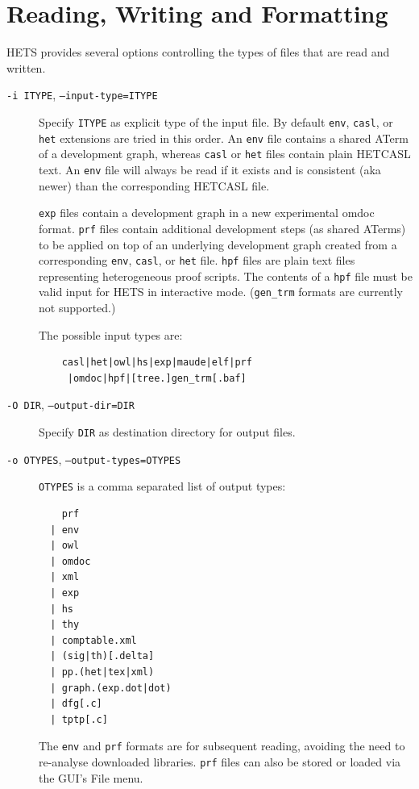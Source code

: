 \documentclass{article}
\newcommand{\normalTEXTSC}[2]{{#1\scriptsize#2}}
\newcommand     {\Hets}{\normalTEXTSC{H}{ETS}\xspace}
\newcommand{\HetCASL}{\normalTEXTSC{H}{ET}\normalTEXTSC{C}{ASL}\xspace}
\begin{document}
\section{Reading, Writing and Formatting}

\Hets provides several options controlling the types of files
that are read and written.
\begin{description}
\item[\texttt{-i ITYPE}, \texttt{--input-type=ITYPE}] Specify \texttt{ITYPE}
  as explicit type of the input file.  By default \texttt{env}, \texttt{casl},
  or \texttt{het} extensions are tried in this order.  An \texttt{env} file
  contains a shared ATerm of a development graph, whereas \texttt{casl} or
  \texttt{het} files contain plain \HetCASL text. An \texttt{env} file will
  always be read if it exists and is consistent (aka newer) than the
  corresponding \HetCASL file.

  \texttt{exp} files contain a development graph in a new experimental omdoc
  format.  \texttt{prf} files contain additional development steps (as shared
  ATerms) to be applied on top of an underlying development graph created from
  a corresponding \texttt{env}, \texttt{casl}, or \texttt{het}
  file. \texttt{hpf} files are plain text files representing heterogeneous
  proof scripts. The contents of a \texttt{hpf} file must be valid input for
  \Hets in interactive mode.  (\texttt{gen\_trm} formats are currently not
  supported.)

The possible input types are:
\begin{verbatim}
    casl|het|owl|hs|exp|maude|elf|prf
     |omdoc|hpf|[tree.]gen_trm[.baf]
\end{verbatim}

\item[\texttt{-O DIR}, \texttt{--output-dir=DIR}]
Specify \texttt{DIR} as destination directory for output files.

\item[\texttt{-o OTYPES}, \texttt{--output-types=OTYPES}]
\texttt{OTYPES} is a comma separated list of output types:
\begin{verbatim}
    prf
  | env
  | owl
  | omdoc
  | xml
  | exp
  | hs
  | thy
  | comptable.xml
  | (sig|th)[.delta]
  | pp.(het|tex|xml)
  | graph.(exp.dot|dot)
  | dfg[.c]
  | tptp[.c]
\end{verbatim}
The \texttt{env} and \texttt{prf} formats are for subsequent reading,
avoiding the need to re-analyse downloaded libraries. \texttt{prf} files
can also be stored or loaded via the GUI's File menu.


\end{description}
\end{document}
